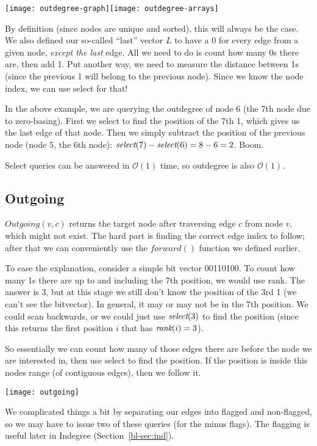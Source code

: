 \medskip\centerline{\texttt{[image: outdegree-graph]}\hfill\texttt{[image: outdegree-arrays]}}\medskip
 
By definition (since nodes are unique and sorted), this will always be the case. We also defined our so-called ``last'' vector $L$ to have a 0 for every edge from a given node, \emph{except the last} edge. All we need to do is count how many 0s there are, then add 1. Put another way, we need to measure the distance between 1s (since the previous 1 will belong to the previous node). Since we know the node index, we can use select for that!

In the above example, we are querying the outdegree of node 6 (the 7th node due to zero-basing). First we select to find the position of the 7th 1, which gives us the last edge of that node. Then we simply subtract the position of the previous node (node 5, the 6th node): 
$\textit{select}(7)-\textit{select}(6)=8-6=2$. Boom.

Select queries can be answered in $\mathcal{O}(1)$ time, so outdegree is also $\mathcal{O}(1)$.

\subsection{Outgoing}\label{bl-sec:outg}

$\textit{Outgoing}(v,c)$ returns the target node after traversing edge $c$ from node $v$, which might not exist. The hard part is finding the correct edge index to follow; after that we can conveniently use the $\textit{forward}()$ function we defined earlier.

To ease the explanation, consider a simple bit vector 00110100. To count how many 1s there are up to and including the 7th position, we would use rank. The answer is 3, but at this stage we still don't know the position of the 3rd 1 (we can't see the bitvector). In general, it may or may not be in the 7th position. We could scan backwards, or we could just use $\textit{select}(3)$ to find the position (since this returns the first position $i$ that has $\textit{rank}(i) = 3$).

So essentially we can count how many of those edges there are before the node we are interested in, then use select to find the position. If the position is inside this nodes range (of contiguous edges), then we follow it.

\medskip\centerline{\texttt{[image: outgoing]}}\medskip

We complicated things a bit by separating our edges into flagged and non-flagged, so we may have to issue two of these queries (for the minus flags). The flagging is useful later in Indegree (Section~\ref{bl-sec:ind}).

